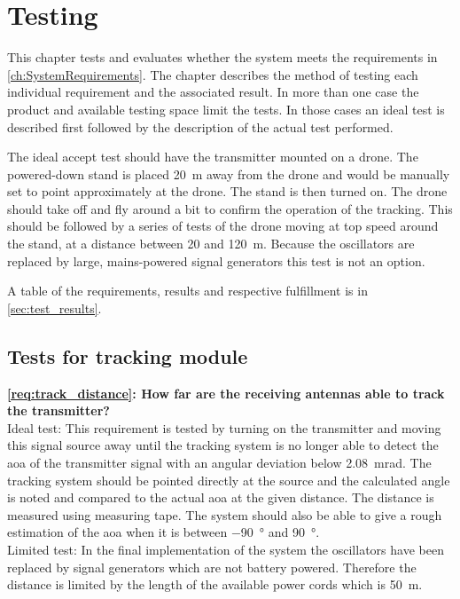 \graphicspath{{figures/test/}}

\chapter{Testing}\label{ch:testing} This chapter tests and evaluates whether the system meets the requirements in \autoref{ch:SystemRequirements}. The chapter describes the method of testing each individual requirement and the associated result. In more than one case the product and available testing space limit the tests. In those cases an ideal test is described first followed by the description of the actual test performed.

The ideal accept test should have the transmitter mounted on a drone. The powered-down stand is placed \SI{20}{\meter} away from the drone and would be manually set to point approximately at the drone. The stand is then turned on. The drone should take off and fly around a bit to confirm the operation of the tracking.
This should be followed by a series of tests of the drone moving at top speed around the stand, at a distance between 20 and \SI{120}{\meter}.
Because the oscillators are replaced by large, mains-powered signal generators this test is not an option.

A table of the requirements, results and respective fulfillment is in \autoref{sec:test_results}.

\section{Tests for tracking module}
\textbf{\autoref{req:track_distance}: How far are the receiving antennas able to track the transmitter?}\\
Ideal test: 
This requirement is tested by turning on the transmitter and moving this signal source away until the tracking system is no longer able to detect the \gls{aoa} of the transmitter signal with an angular deviation below \SI{2.08}{\milli\radian}. The tracking system should be pointed directly at the source and the calculated angle is noted and compared to the actual \gls{aoa} at the given distance. The distance is measured using measuring tape. The system should also be able to give a rough estimation of the \gls{aoa} when it is between \SI{-90}{\degree} and \SI{90}{\degree}. \\
Limited test: 
In the final implementation of the system the oscillators have been replaced by signal generators which are not battery powered. Therefore the distance is limited by the length of the available power cords which is \SI{50}{\meter}. 

